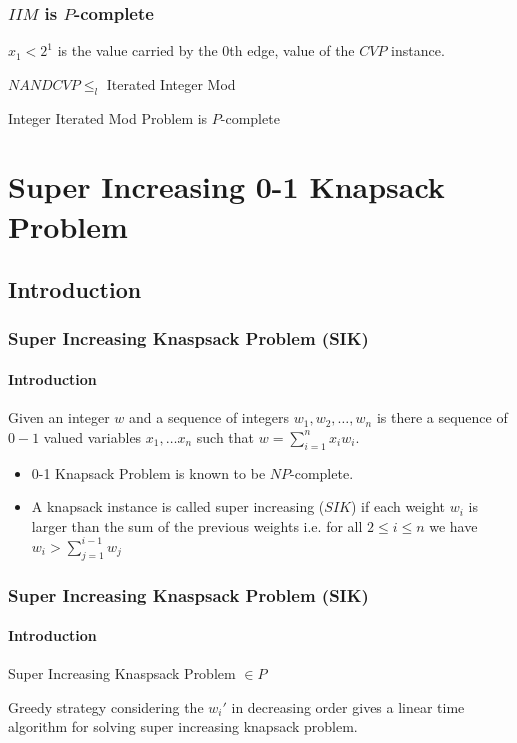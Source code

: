 \documentclass[article,10pt]{beamer}%
\begin{document}
\begin{frame}
	\frametitle{$IIM$ is $P$-complete}

$x_1< 2^{1}$ is the value carried by the $0$th edge, value of the $CVP$ instance. 
\begin{theorem}
		$NANDCVP\leq_l $ Iterated Integer Mod
\end{theorem}
	 	\vspace{5mm}
	 	
	\begin{theorem}
		Integer Iterated Mod Problem is $P$-complete
	\end{theorem}
\end{frame}
\section{Super Increasing 0-1 Knapsack Problem}
\subsection{Introduction}
\begin{frame}
\frametitle{Super Increasing Knaspsack Problem (SIK)}
\framesubtitle{Introduction}
\begin{definition}
	Given an integer $w$ and a sequence of integers $w_1,w_2,\dots, w_n$ is there a sequence of $0-1$ valued variables $x_1,\dots x_n$ such that $w=\sum\limits_{i=1}^n x_iw_i$.
\end{definition}
\begin{itemize}
	\item 0-1 Knapsack Problem is known to be $NP$-complete. \cite{guidetonpc}
	\item A knapsack instance is called super increasing ($SIK$) if each weight $w_i$ is larger than the sum of the previous weights i.e. for all $2\leq i\leq n$ we have $w_i>\sum\limits_{j=1}^{i-1}w_j$
\end{itemize}
\end{frame}
\begin{frame}
	\frametitle{Super Increasing Knaspsack Problem (SIK)}
	\framesubtitle{Introduction}
\begin{theorem}
	Super Increasing Knaspsack Problem $\in P$
\end{theorem}\vspace{5mm}

Greedy strategy considering the $w_i'$ in decreasing order gives a linear time algorithm for solving super increasing knapsack problem.
\end{frame}
\end{document}
